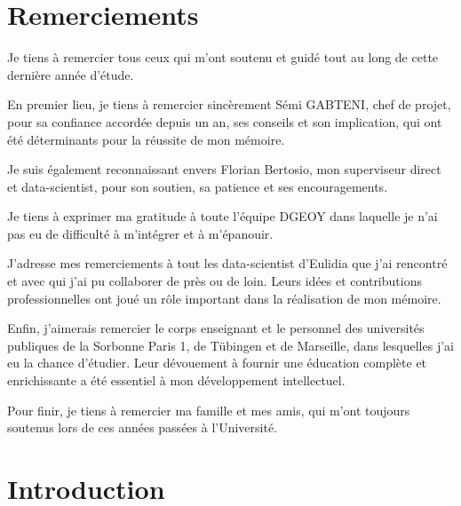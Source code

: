 \documentclass[12pt]{article}
\begin{document}
\newpage
\thispagestyle{empty}
\mbox{}

\newpage
\section*{Remerciements}


Je tiens à remercier tous ceux qui m'ont soutenu et guidé tout au long de cette dernière année d'étude.\hfill
\break

 
En premier lieu, je tiens à remercier sincèrement Sémi GABTENI, chef de projet, pour sa confiance accordée depuis un an, ses conseils et son implication, qui ont été déterminants pour la réussite de mon mémoire.\hfill
\break


Je suis également reconnaissant envers Florian Bertosio, mon superviseur direct et data-scientist, pour son soutien, sa patience et ses encouragements.\hfill
\break
 
Je tiens à exprimer ma gratitude à toute l'équipe DGEOY dans laquelle je n'ai pas eu de difficulté à m'intégrer et à m'épanouir. \hfill
\break

 
J'adresse mes remerciements à tout les data-scientist d'Eulidia que j'ai rencontré et avec qui j'ai pu collaborer de près ou de loin. Leurs idées et contributions professionnelles ont joué un rôle important dans la réalisation de mon mémoire.\hfill
\break

 
Enfin, j'aimerais remercier le corps enseignant et le personnel des universités publiques de la Sorbonne Paris 1, de Tübingen et de Marseille, dans lesquelles j'ai eu la chance d'étudier. Leur dévouement à fournir une éducation complète et enrichissante a été essentiel à mon développement intellectuel.\hfill \break


Pour finir, je tiens à remercier ma famille et mes amis, qui m'ont toujours soutenus lors de ces années passées à l'Université.

\newpage

\renewcommand{\contentsname}{Table of contents}\tableofcontents


\newpage
\thispagestyle{empty}
\mbox{}


\newpage
\listoffigures
\listoftables



\newpage
\thispagestyle{empty}
\mbox{}
\newpage
\section*{Introduction}
\label{introduction}
\end{document}
